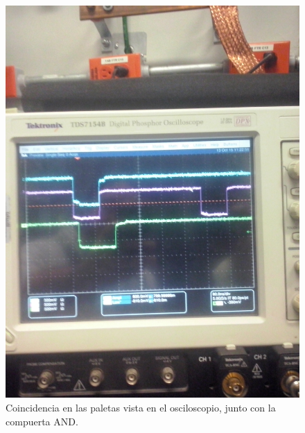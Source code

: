 \documentclass[a4paper,10pt]{article}
\numberwithin{equation}{section}
\begin{document}
\begin{figure}[H]
 \center 
 \includegraphics[scale=0.2]{Imagenes/coincidencia1}
 \caption{Coincidencia en las paletas vista en el osciloscopio, junto con la
 compuerta AND.}
\end{figure}
\end{document}
